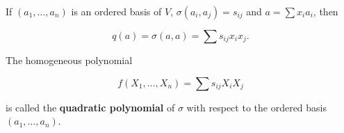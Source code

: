 If $(a_1, \ldots, a_n)$ is an ordered basis of $V$, $\sigma(a_i, a_j) = s_{ij}$ and $a = \sum x_i a_i$, then

$$q(a) = \sigma(a, a) = \sum s_{ij} x_i x_j.$$

The homogeneous polynomial

$$f(X_1, \ldots, X_n) = \sum s_{ij} X_i X_j$$

is called the \textbf{quadratic polynomial} of $\sigma$ with respect to the ordered basis $(a_1, \ldots, a_n)$.
